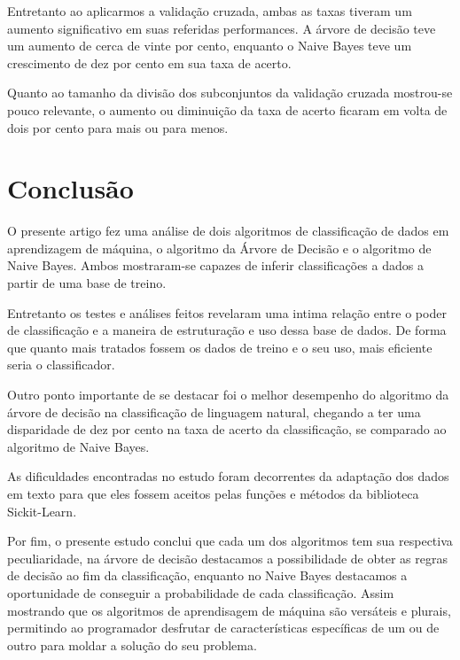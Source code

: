 \documentclass[preprint,12pt,times]{elsarticle}
\begin{document}
	Entretanto ao aplicarmos a validação cruzada, ambas as taxas tiveram um aumento significativo em suas referidas performances. A árvore de decisão teve um aumento de cerca de vinte por cento, enquanto o Naive Bayes teve um crescimento de dez por cento em sua taxa de acerto.
	
	Quanto ao tamanho da divisão dos subconjuntos da validação cruzada mostrou-se pouco relevante, o aumento ou diminuição da taxa de acerto ficaram em volta de dois por cento para mais ou para menos. 
	
	\section{Conclusão}
	\label{Conclusão}
	O presente artigo fez uma análise de dois algoritmos de classificação de dados em aprendizagem de máquina, o algoritmo da Árvore de Decisão e o algoritmo de Naive Bayes. Ambos mostraram-se capazes de inferir classificações a dados a partir de uma base de treino. 
	
	Entretanto os testes e análises feitos revelaram uma intima relação entre o poder de classificação e a maneira de estruturação e uso dessa base de dados. De forma que quanto mais tratados fossem os dados de treino e o seu uso, mais eficiente seria o classificador.
	
	Outro ponto importante de se destacar foi o melhor desempenho do algoritmo da árvore de decisão na classificação de linguagem natural, chegando a ter uma disparidade de dez por cento na taxa de acerto da classificação, se comparado ao algoritmo de Naive Bayes.
	
	As dificuldades encontradas no estudo foram decorrentes da adaptação dos dados em texto para que eles fossem aceitos pelas funções e métodos da biblioteca Sickit-Learn.
	
	
	Por fim, o presente estudo conclui que cada um dos algoritmos tem sua respectiva peculiaridade, na árvore de decisão destacamos a possibilidade de obter as regras de decisão ao fim da classificação, enquanto no Naive Bayes destacamos a oportunidade de conseguir a probabilidade de cada classificação. Assim mostrando que os algoritmos de aprendisagem de máquina são versáteis e plurais, permitindo ao programador desfrutar de características específicas de um ou de outro para moldar a solução do seu problema.
		
	
	
\end{document}
